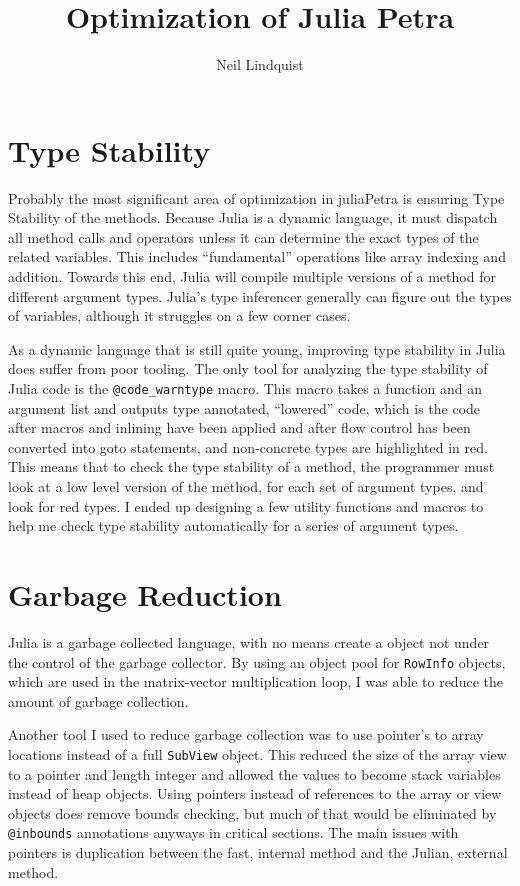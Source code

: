 \documentclass{article}
\title{Optimization of Julia Petra}
\author{Neil Lindquist}
\newcommand{\juliaSnippet}[1]{\lstinline{#1}}
\begin{document}
	
\section{Type Stability}
Probably the most significant area of optimization in juliaPetra is ensuring Type Stability of the methods.
Because Julia is a dynamic language, it must dispatch all method calls and operators unless it can
determine the exact types of the related variables.  This includes ``fundamental'' operations like array indexing and addition.
Towards this end, Julia will compile multiple versions of a method for different argument types.
Julia's type inferencer generally can figure out the types of variables, although it struggles on a few
corner cases.

As a dynamic language that is still quite young, improving type stability in Julia does suffer from poor tooling.
The only tool for analyzing the type stability of Julia code is the \juliaSnippet{@code_warntype} macro.
This macro takes a function and an argument list and outputs type annotated, ``lowered'' code, which is the code
after macros and inlining have been applied and after flow control has been converted into goto statements, and
non-concrete types are highlighted in red.  This means that to check the type stability of a method, the
programmer must look at a low level version of the method, for each set of argument types, and look for red types.
I ended up designing a few utility functions and macros to help me check type stability automatically for
a series of argument types.

\section{Garbage Reduction}
Julia is a garbage collected language, with no means create a object not under the control of the garbage collector.
By using an object pool for \juliaSnippet{RowInfo} objects, which are used in the matrix-vector multiplication loop, I was able to reduce the amount of garbage collection.

Another tool I used to reduce garbage collection was to use pointer's to array locations instead of a full \juliaSnippet{SubView} object.
This reduced the size of the array view to a pointer and length integer and allowed the values to become stack variables instead of heap objects.
Using pointers instead of references to the array or view objects does remove bounds checking, but much of that would be eliminated by
\juliaSnippet{@inbounds} annotations anyways in critical sections.
The main issues with pointers is duplication between the fast, internal method and the Julian, external method.
\end{document}
